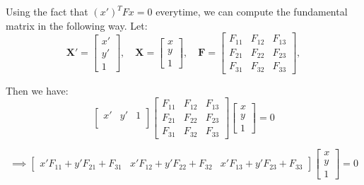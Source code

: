 Using the fact that $(x')^T F x = 0$ everytime, we can compute the fundamental matrix in the following way. Let:
\begin{equation*}
{\mathbf X'} = 
\begin{bmatrix}
x' \\
y' \\
1
\end{bmatrix},
\quad
{\mathbf X} = 
\begin{bmatrix}
x \\
y \\
1
\end{bmatrix},
\quad
{\mathbf F} = 
\begin{bmatrix}
F_{11} & F_{12} & F_{13}\\
F_{21} & F_{22} & F_{23}\\
F_{31} & F_{32} & F_{33}
\end{bmatrix},
\end{equation*}

Then we have:
\begin{equation*}
\begin{bmatrix}
x' & y' & 1 \\
\end{bmatrix} 
\begin{bmatrix}
F_{11} & F_{12} & F_{13}\\
F_{21} & F_{22} & F_{23}\\
F_{31} & F_{32} & F_{33}
\end{bmatrix}
\begin{bmatrix}
x \\
y \\
1
\end{bmatrix}
= 0
\end{equation*}

\begin{equation*}
\implies
\begin{bmatrix}
x'F_{11} + y'F_{21} + F_{31} & x'F_{12} + y'F_{22} + F_{32} & x'F_{13} + y'F_{23} + F_{33}
\end{bmatrix}
\begin{bmatrix}
x \\
y \\
1
\end{bmatrix}
 = 0
\end{equation*}

